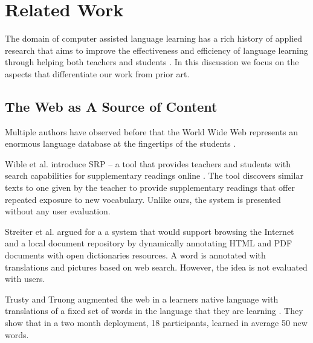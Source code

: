 \section{Related Work}

The domain of computer assisted language learning has a rich history of applied research that aims to improve the effectiveness and efficiency of language learning through helping both teachers and students \cite{levy2013call}. In this discussion we focus on the aspects that differentiate our work from prior art.


\subsection{The Web as A Source of Content}

Multiple authors have observed before that the World Wide Web represents an enormous language database at the fingertips of the students \cite{Fried08-Learner,Hira07-WebCorpora,Streit05-Browsers,Wible01-Exposure,Trus11web}. 


	Wible et al. introduce SRP -- a tool that provides teachers and students with search capabilities for supplementary readings online \cite{Wible01-Exposure}.
	The tool discovers similar texts to one given by the teacher to provide supplementary readings that offer repeated exposure to new vocabulary.
	Unlike ours, the system is presented without any user evaluation.

	
	Streiter et al. \cite{Streit05-Browsers} argued for a a system that would support browsing the Internet and a local document repository by dynamically annotating HTML and PDF documents with open dictionaries resources. A word is annotated with translations and pictures based on web search. 
	However, the idea is not evaluated with users.

	
	Trusty and Truong augmented the web in a learners native language with translations of a fixed set of words in the language that they are learning \cite{Trus11web}. They show that in a two month deployment, 18 participants, learned in average 50 new words.

